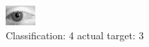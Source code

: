 \begin{figure}[h!]
\begin{center}
\includegraphics[width=0.60\columnwidth]{figures/ID2789_class_4_target_3.png}
\end{center}
\caption{ Classification: 4 actual target: 3}
\label{fig:ID2789_class_4_target_3}
\end{figure}
